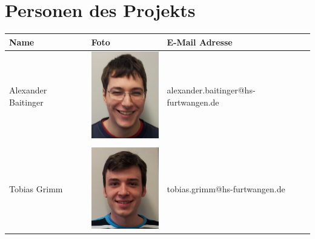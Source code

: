 \chapter*{Personen des Projekts}

\begin{table}[h]
  \sffamily
  \centering
  \small
  \label{tab:Personen}
  \begin{tabular}{m{4cm} m{3cm} m{8cm} }
    \toprule
    Name & Foto & E-Mail Adresse\\
   \midrule

      Alexander Baitinger      & \includegraphics[width=3cm]{Bilder/Personen/Adam_V.jpg} & alexander.baitinger@hs-furtwangen.de\\\\
   \cmidrule(lr){1-3}
      Tobias Grimm      & \includegraphics[width=3cm]{Bilder/Personen/Tobi_G.jpg} & tobias.grimm@hs-furtwangen.de\\
   \bottomrule
  \end{tabular}
\end{table}